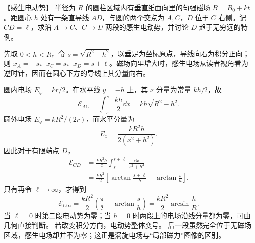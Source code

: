 {\begin{origexamplebox}{【感生电动势】}\label{ch24:ex:s40-9-12}
半径为 $R$ 的圆柱区域内有垂直纸面向里的匀强磁场
$B=B_0+kt$。距圆心 $h$ 处有一条直导线 $AD$，与圆的两个交点为 $A,C$，$D$ 位于 $C$ 右侧。记 $CD=\ell$，求沿 $A\to C$、$C\to D$ 两段的感生电动势，并讨论 $D$ 趋于无穷远的特例。

%
\begin{center}\end{center}
\end{origexamplebox}

\begin{xesolution}
先取 $0<h<R$，令 $s=\sqrt{R^2-h^2}$，以垂足为坐标原点，导线向右为积分正向；则 $x_A=-s$、$x_C=s$、$x_D=s+\ell$。磁场向里增大时，感生电场从读者视角看为逆时针，因而在圆心下方的导线上其分量向右。

圆内电场 $E_\varphi=kr/2$。在水平线 $y=-h$ 上，其 $x$ 分量为常量 $kh/2$，故
\begin{equation}
  \boxed{\mathcal E_{AC}=\int_{-s}^{s}\frac{kh}{2}\dd x
  =kh\sqrt{R^2-h^2}}.
\end{equation}
圆外电场 $E_\varphi=kR^2/(2r)$，而水平分量为
\begin{equation}
  E_x=\frac{kR^2h}{2(x^2+h^2)}.
\end{equation}
因此对于有限端点 $D$，
\begin{align}
  \mathcal E_{CD}
  &=\frac{kR^2h}{2}\int_s^{s+\ell}\frac{\dd x}{x^2+h^2}\\
  &=\boxed{\frac{kR^2}{2}\left[\arctan\frac{s+\ell}{h}-\arctan\frac{s}{h}\right]}.
\end{align}
只有再令 $\ell\to\infty$，才得到
\[
 \boxed{\mathcal E_{C\infty}=\frac{kR^2}{2}\left(\frac\pi2-\arctan\frac{s}{h}\right)
 =\frac{kR^2}{2}\arcsin\frac hR}.
\]
当 $\ell=0$ 时第二段电动势为零；当 $h=0$ 时两段上的电场沿线分量都为零，可由几何直接判断。
若改变积分方向，电动势整体变号。
后一段虽然完全位于无磁场区域，感生电场却并不为零；这正是涡旋电场与“局部磁力”图像的区别。


\end{xesolution}}
